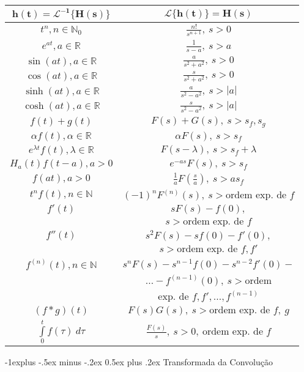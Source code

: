\documentclass[10pt,landscape]{article}
\makeatletter
\newcommand{\Lagr}{\mathcal{L}}
\renewcommand{\subsection}{\@startsection{subsection}{2}{0mm}%
                                {-1explus -.5ex minus -.2ex}%
                                {0.5ex plus .2ex}%
                                {\normalfont\normalsize\bfseries}}
\makeatother
\begin{document}
\begin{multicols}{3}
\bgroup
\def\arraystretch{1.5}
\begin{tabular}{|c|c|}
\hline
$\mathbf{h(t) = \Lagr^{-1}\{H(s)\}}$ & $\mathbf{\Lagr\{h(t)\} = H(s)}$ \\
\hline
$t^n, n \in \mathbb{N}_0$ & $\frac{n!}{s^{n+1}},\ s > 0$ \\
\hline
$e^{at}, a \in \mathbb{R}$ & $\frac{1}{s-a},\ s > a$ \\
\hline
$\sin(at), a \in \mathbb{R}$ & $\frac{a}{s^2 + a^2},\ s > 0$ \\
\hline
$\cos(at), a \in \mathbb{R}$ & $\frac{s}{s^2 + a^2},\ s > 0$ \\
\hline
$\sinh(at), a \in \mathbb{R}$ & $\frac{a}{s^2 - a^2},\ s > |a|$\\
\hline
$\cosh(at), a \in \mathbb{R}$ & $\frac{s}{s^2 - a^2},\ s > |a|$\\
\hline
$f(t) + g(t)$ & $F(s) + G(s),\ s > s_f, s_g$\\
\hline
$\alpha f(t), \alpha \in \mathbb{R}$ & $\alpha F(s),\ s > s_f$ \\
\hline
$e^{\lambda t} f(t), \lambda \in \mathbb{R}$ & $F(s-\lambda),\ s > s_f + \lambda$ \\
\hline
$H_a(t)f(t-a), a > 0$ & $e^{-as}F(s),\ s > s_f$ \\
\hline
$f(at), a > 0$ & $\frac{1}{a}F(\frac{s}{a}),\ s > as_f$ \\
\hline
$t^n f(t), n \in \mathbb{N}$ & $(-1)^n F^{(n)}(s),\ s > \text{ordem exp. de } f$\\
\hline
$f'(t)$ & $sF(s) - f(0),$\\
$ $ & $s > \text{ordem exp. de } f$\\
\hline
$f''(t)$ & $s^2 F(s) - sf(0) - f'(0),$\\
$ $ & $s > \text{ordem exp. de } f, f'$\\
\hline
$f^{(n)}(t), n \in \mathbb{N}$ & $s^n F(s) - s^{n-1} f(0) - s^{n-2} f'(0) - $\\
$ $ & $... - f^{(n-1)}(0),\ s > \text{ordem}$\\
$ $ & $\text{exp. de } f, f', ..., f^{(n-1)}$\\
\hline
$(f*g)(t)$ & $F(s)G(s),\ s > \text{ordem exp. de }f,\ g$\\
\hline
$\int\limits_0^t f(\tau)\ d\tau$ & $\frac{F(s)}{s},\ s > 0,\ \text{ordem exp. de }f$\\
\hline
\end{tabular}
\egroup

\subsection{Transformada da Convolução}


\end{multicols}
\end{document}
